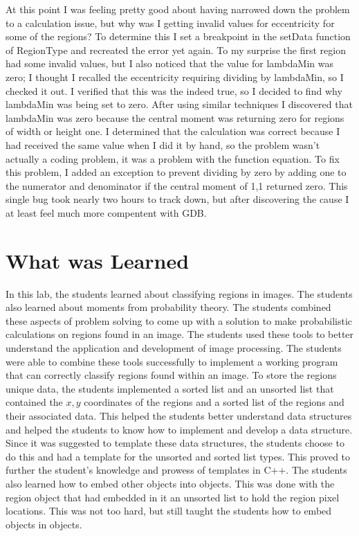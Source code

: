 \documentclass[pdftex, 11pt]{article}
\begin{document}
At this point I was feeling pretty good about having narrowed down the problem to a calculation issue, but why was I
getting invalid values for eccentricity for some of the regions?  To determine this I set a breakpoint in the
setData function of RegionType and recreated the error yet again.  To my surprise the first region had some invalid
values, but I also noticed that the value for lambdaMin was zero; I thought I recalled the eccentricity requiring
dividing by lambdaMin, so I checked it out.  I verified that this was the indeed true, so I decided to find why
lambdaMin was being set to zero.  After using similar techniques I discovered that lambdaMin was zero because the central
moment was returning zero for regions of width or height one.  I determined that the calculation was correct because I
had received the same value when I did it by hand, so the problem wasn't actually a coding problem, it was a problem with
the function equation.  To fix this problem, I added an exception to prevent dividing by zero by adding one to the
numerator and denominator if the central moment of 1,1 returned zero.  This single bug took nearly two hours to track
down, but after discovering the cause I at least feel much more compentent with GDB.


\section{What was Learned}

In this lab, the students learned about classifying regions in images. The students also learned about moments from
probability theory. The students combined these aspects of problem solving to come up with a solution to make
probabilistic calculations on regions found in an image.  The students used these tools to better understand the
application and development of image processing. The students were able to combine these tools successfully to implement
a working program that can correctly classify regions found within an image. To store the regions unique data, the
students implemented a sorted list and an unsorted list that contained the $x,y$ coordinates of the regions and a sorted
list of the regions and their associated data. This helped the students better understand data structures and helped the
students to know how to implement and develop a data structure. Since it was suggested to template these data
structures, the students choose to do this and had a template for the unsorted and sorted list types. This proved to
further the student's knowledge and prowess of templates in C++.  The students also learned how to embed other objects
into objects. This was done with the region object that had embedded in it an unsorted list to hold the region pixel
locations. This was not too hard, but still taught the students how to embed objects in objects.
\end{document}
